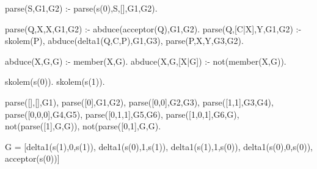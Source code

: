 parse(S,G1,G2) :- parse(s(0),S,[],G1,G2).

parse(Q,X,X,G1,G2) :- abduce(acceptor(Q),G1,G2).
parse(Q,[C|X],Y,G1,G2) :- skolem(P), abduce(delta1(Q,C,P),G1,G3), parse(P,X,Y,G3,G2).

abduce(X,G,G) :- member(X,G).
abduce(X,G,[X|G]) :- not(member(X,G)).

skolem(s(0)). skolem(s(1)).

parse([],[],G1), parse([0],G1,G2), parse([0,0],G2,G3), parse([1,1],G3,G4), parse([0,0,0],G4,G5), parse([0,1,1],G5,G6), parse([1,0,1],G6,G), not(parse([1],G,G)), not(parse([0,1],G,G).

G = [delta1(s(1),0,s(1)), delta1(s(0),1,s(1)), delta1(s(1),1,s(0)), delta1(s(0),0,s(0)), acceptor(s(0))]